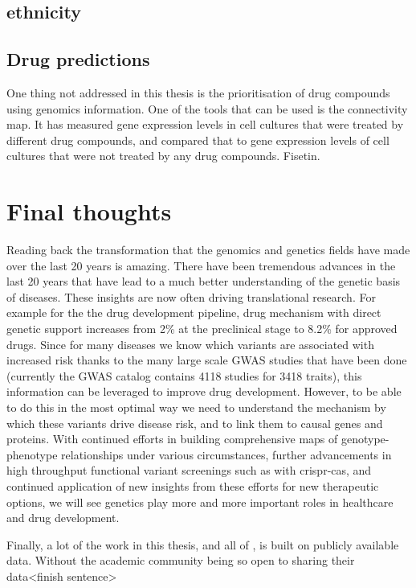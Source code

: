 \subsection{ethnicity}

\subsection{Drug predictions}
One thing not addressed in this thesis is the prioritisation of drug compounds using genomics information. One of the tools that can be used is the connectivity map\cite{lambConnectivityMapUsing2006}. It has measured gene expression levels in cell cultures that were treated by different drug compounds, and compared that to gene expression levels of cell cultures that were not treated by any drug compounds. Fisetin\cite{gibbsHumanGenomeProject2020}.

\section{Final thoughts}
Reading back the transformation that the genomics and genetics fields have made over the last 20 years is amazing. There have been tremendous advances in the last 20 years that have lead to a much better understanding of the genetic basis of diseases. These insights are now often driving translational research. For example for the the drug development pipeline, drug mechanism with direct genetic support increases from 2\% at the preclinical stage to 8.2\% for approved drugs\cite{nelsonSupportHumanGenetic2015d}. Since for many diseases we know which variants are associated with increased risk thanks to the many large scale GWAS studies that have been done (currently the GWAS catalog\cite{macarthurNewNHGRIEBICatalog2017a} contains 4118 studies for 3418 traits), this information can be leveraged to improve drug development. However, to be able to do this in the most optimal way we need to understand the mechanism by which these variants drive disease risk, and to link them to causal genes and proteins.
 With continued efforts in building comprehensive maps of genotype-phenotype relationships under various circumstances, further advancements in high throughput functional variant screenings such as with crispr-cas, and continued application of new insights from these efforts for new therapeutic options, we will see genetics play more and more important roles in healthcare and drug development. 

Finally, a lot of the work in this thesis, and all of , is built on publicly available data. Without the academic community being so open to sharing their data<finish sentence> 
